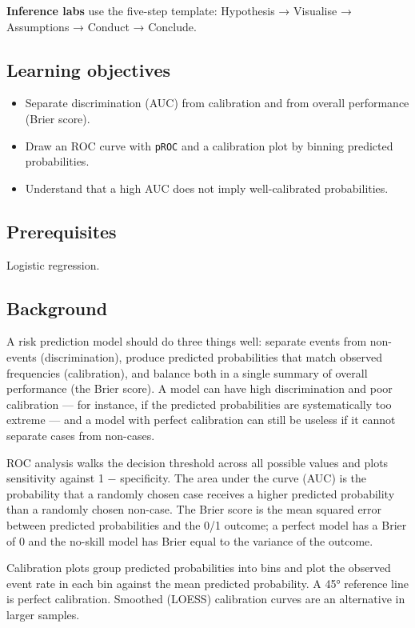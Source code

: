 \documentclass[
]{article}
\author{}
\date{\vspace{-2.5em}}
\providecommand{\tightlist}{%
  \setlength{\itemsep}{0pt}\setlength{\parskip}{0pt}}
\begin{document}
\textbf{Inference labs} use the five-step template: Hypothesis →
Visualise → Assumptions → Conduct → Conclude.

\subsection{Learning objectives}\label{learning-objectives}

\begin{itemize}
\tightlist
\item
  Separate discrimination (AUC) from calibration and from overall
  performance (Brier score).
\item
  Draw an ROC curve with \texttt{pROC} and a calibration plot by binning
  predicted probabilities.
\item
  Understand that a high AUC does not imply well-calibrated
  probabilities.
\end{itemize}

\subsection{Prerequisites}\label{prerequisites}

Logistic regression.

\subsection{Background}\label{background}

A risk prediction model should do three things well: separate events
from non-events (discrimination), produce predicted probabilities that
match observed frequencies (calibration), and balance both in a single
summary of overall performance (the Brier score). A model can have high
discrimination and poor calibration --- for instance, if the predicted
probabilities are systematically too extreme --- and a model with
perfect calibration can still be useless if it cannot separate cases
from non-cases.

ROC analysis walks the decision threshold across all possible values and
plots sensitivity against 1 − specificity. The area under the curve
(AUC) is the probability that a randomly chosen case receives a higher
predicted probability than a randomly chosen non-case. The Brier score
is the mean squared error between predicted probabilities and the 0/1
outcome; a perfect model has a Brier of 0 and the no-skill model has
Brier equal to the variance of the outcome.

Calibration plots group predicted probabilities into bins and plot the
observed event rate in each bin against the mean predicted probability.
A 45° reference line is perfect calibration. Smoothed (LOESS)
calibration curves are an alternative in larger samples.
\end{document}
